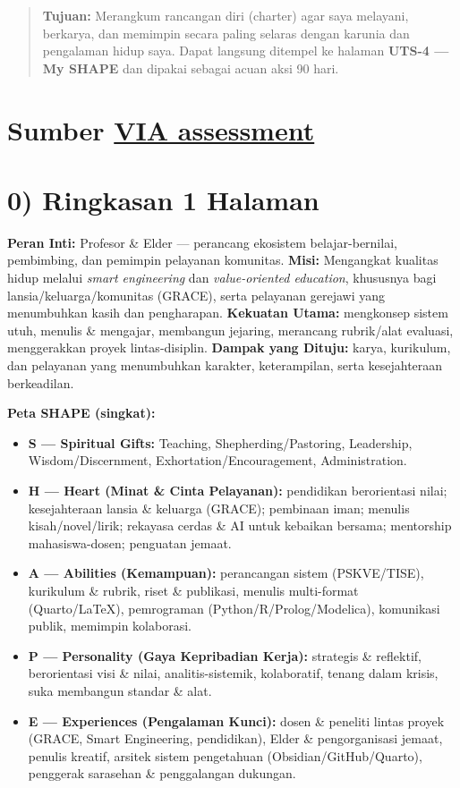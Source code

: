 \documentclass[
  letterpaper,
  DIV=11,
  numbers=noendperiod]{scrreprt}
\providecommand{\tightlist}{%
  \setlength{\itemsep}{0pt}\setlength{\parskip}{0pt}}
\begin{document}
\begin{quote}
\textbf{Tujuan:} Merangkum rancangan diri (charter) agar saya melayani,
berkarya, dan memimpin secara paling selaras dengan karunia dan
pengalaman hidup saya. Dapat langsung ditempel ke halaman \textbf{UTS-4
--- My SHAPE} dan dipakai sebagai acuan aksi 90 hari.
\end{quote}

\section{\texorpdfstring{Sumber
\href{StrengthsProfile-Armein-Langi.pdf}{VIA
assessment}}{Sumber VIA assessment}}\label{sumber-via-assessment}

\section{0) Ringkasan 1 Halaman}\label{ringkasan-1-halaman}

\textbf{Peran Inti:} Profesor \& Elder --- perancang ekosistem
belajar-bernilai, pembimbing, dan pemimpin pelayanan komunitas.
\textbf{Misi:} Mengangkat kualitas hidup melalui \emph{smart
engineering} dan \emph{value-oriented education}, khususnya bagi
lansia/keluarga/komunitas (GRACE), serta pelayanan gerejawi yang
menumbuhkan kasih dan pengharapan. \textbf{Kekuatan Utama:} mengkonsep
sistem utuh, menulis \& mengajar, membangun jejaring, merancang
rubrik/alat evaluasi, menggerakkan proyek lintas-disiplin.
\textbf{Dampak yang Dituju:} karya, kurikulum, dan pelayanan yang
menumbuhkan karakter, keterampilan, serta kesejahteraan berkeadilan.

\textbf{Peta SHAPE (singkat):}

\begin{itemize}
\tightlist
\item
  \textbf{S --- Spiritual Gifts:} Teaching, Shepherding/Pastoring,
  Leadership, Wisdom/Discernment, Exhortation/Encouragement,
  Administration.
\item
  \textbf{H --- Heart (Minat \& Cinta Pelayanan):} pendidikan
  berorientasi nilai; kesejahteraan lansia \& keluarga (GRACE);
  pembinaan iman; menulis kisah/novel/lirik; rekayasa cerdas \& AI untuk
  kebaikan bersama; mentorship mahasiswa-dosen; penguatan jemaat.
\item
  \textbf{A --- Abilities (Kemampuan):} perancangan sistem (PSKVE/TISE),
  kurikulum \& rubrik, riset \& publikasi, menulis multi-format
  (Quarto/LaTeX), pemrograman (Python/R/Prolog/Modelica), komunikasi
  publik, memimpin kolaborasi.
\item
  \textbf{P --- Personality (Gaya Kepribadian Kerja):} strategis \&
  reflektif, berorientasi visi \& nilai, analitis-sistemik, kolaboratif,
  tenang dalam krisis, suka membangun standar \& alat.
\item
  \textbf{E --- Experiences (Pengalaman Kunci):} dosen \& peneliti
  lintas proyek (GRACE, Smart Engineering, pendidikan), Elder \&
  pengorganisasi jemaat, penulis kreatif, arsitek sistem pengetahuan
  (Obsidian/GitHub/Quarto), penggerak sarasehan \& penggalangan
  dukungan.
\end{itemize}
\end{document}
